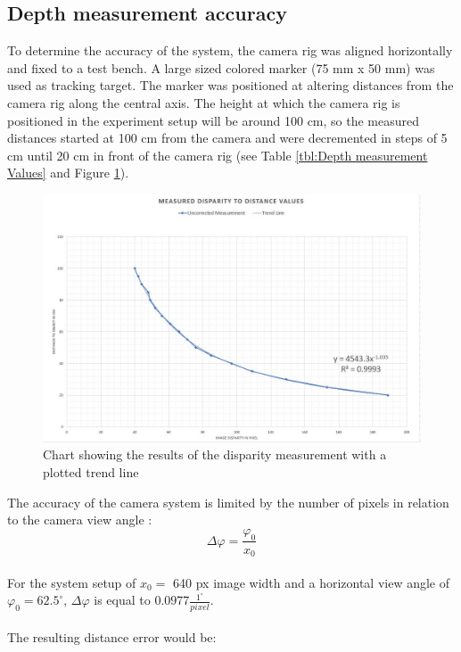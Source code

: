\subsection{Depth measurement accuracy}
To determine the accuracy of the system, the camera rig was aligned horizontally and fixed to a test bench. A large sized colored marker (75 mm x 50 mm) was used as tracking target. The marker was positioned at altering distances from the camera rig along the central axis. The height at which the camera rig is positioned in the experiment setup will be around 100 cm, so the measured distances started at 100 cm from the camera and were decremented in steps of 5 cm until 20 cm in front of the camera rig (see Table \ref{tbl:Depth measurement Values} and Figure \ref{char:DisparityToDistanceChart}).\\
\begin{figure}[H]
\includegraphics[width=\textwidth]{images/Disparity_to_distance.JPG}
\caption{Chart showing the results of the disparity measurement with a plotted trend line}
\label{char:DisparityToDistanceChart} 
\end{figure}
The accuracy of the camera system is limited by the number of pixels in relation to the camera view angle \cite{JernejMrovlje.2008}:\\
\begin{equation}
\Delta\varphi=\frac{\varphi_0}{x_0}
\end{equation}
\\
For the system setup of $x_{0}=$ 640 px image width and a horizontal view angle of $\varphi_{0}=62.5^\circ$, $\Delta\varphi$ is equal to $0.0977\frac{1^\circ}{pixel}$.\\\\
The resulting distance error would be:\\
